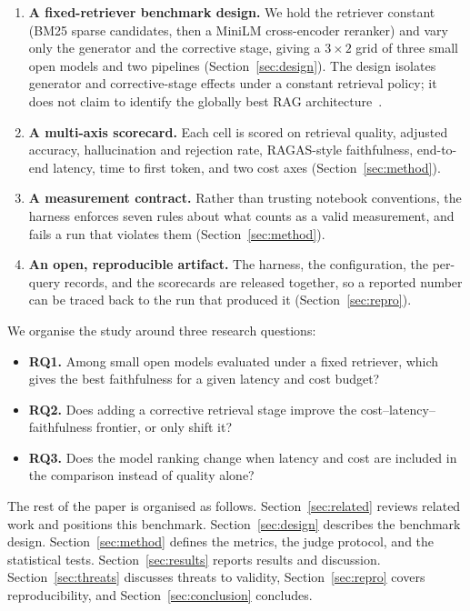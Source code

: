 \begin{enumerate}
    \item \textbf{A fixed-retriever benchmark design.} We hold the
          retriever constant (BM25 sparse candidates, then a MiniLM
          cross-encoder reranker) and vary only the generator and the
          corrective stage, giving a $3 \times 2$ grid of three small
          open models and two pipelines (Section~\ref{sec:design}). The
          design isolates generator and corrective-stage effects under a
          constant retrieval policy; it does not claim to identify the
          globally best RAG architecture~\cite{elkiran2026empirical}.

    \item \textbf{A multi-axis scorecard.} Each cell is scored on
          retrieval quality, adjusted accuracy, hallucination and
          rejection rate, RAGAS-style faithfulness, end-to-end latency,
          time to first token, and two cost axes (Section~\ref{sec:method}).

    \item \textbf{A measurement contract.} Rather than trusting notebook
          conventions, the harness enforces seven rules about what counts
          as a valid measurement, and fails a run that violates them
          (Section~\ref{sec:method}).

    \item \textbf{An open, reproducible artifact.} The harness, the
          configuration, the per-query records, and the scorecards are
          released together, so a reported number can be traced back to
          the run that produced it (Section~\ref{sec:repro}).
\end{enumerate}

We organise the study around three research questions:
\begin{itemize}
    \item \textbf{RQ1.} Among small open models evaluated under a fixed
          retriever, which gives the best faithfulness for a given
          latency and cost budget?
    \item \textbf{RQ2.} Does adding a corrective retrieval stage improve
          the cost--latency--faithfulness frontier, or only shift it?
    \item \textbf{RQ3.} Does the model ranking change when latency and
          cost are included in the comparison instead of quality alone?
\end{itemize}

The rest of the paper is organised as follows.
Section~\ref{sec:related} reviews related work and positions this
benchmark. Section~\ref{sec:design} describes the benchmark design.
Section~\ref{sec:method} defines the metrics, the judge protocol, and the
statistical tests. Section~\ref{sec:results} reports results and
discussion. Section~\ref{sec:threats} discusses threats to validity,
Section~\ref{sec:repro} covers reproducibility, and
Section~\ref{sec:conclusion} concludes.
